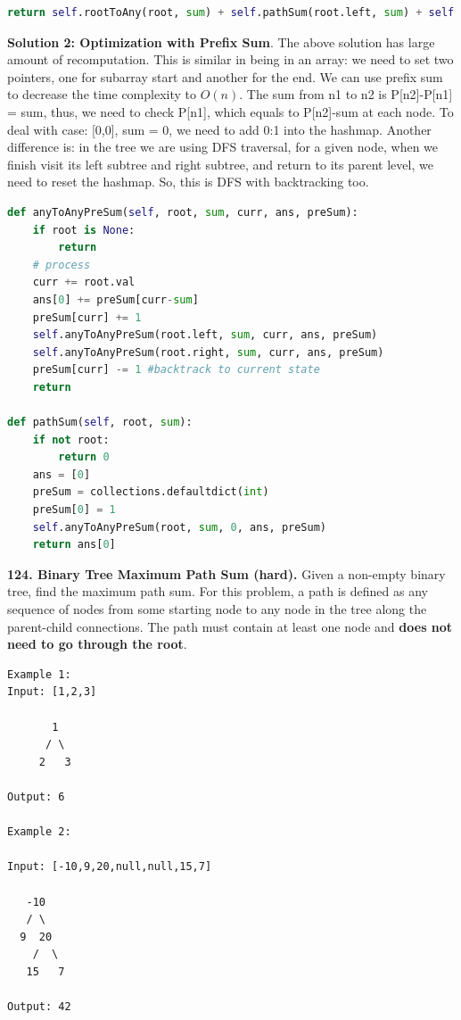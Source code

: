 \documentclass[../main.tex]{subfiles}
\begin{document}
\begin{examples}[resume]
\begin{lstlisting}[language = Python]
    return self.rootToAny(root, sum) + self.pathSum(root.left, sum) + self.pathSum(root.right, sum)
\end{lstlisting}
\textbf{Solution 2: Optimization with Prefix Sum}. The above solution has large amount of recomputation. This is similar in being in an array: we need to set two pointers, one for subarray start and another for the end. We can use prefix sum to decrease the time complexity to $O(n)$. The sum from n1 to n2 is P[n2]-P[n1] = sum, thus, we need to check P[n1], which equals to P[n2]-sum at each node.  To deal with case: [0,0], sum = 0, we need to add 0:1 into the hashmap. Another difference is: in the tree we are using DFS traversal, for a given node, when we finish visit its left subtree and right subtree, and return to its parent level, we need to reset the hashmap. So, this is DFS with backtracking too.
\begin{lstlisting}[language=Python]
def anyToAnyPreSum(self, root, sum, curr, ans, preSum):
    if root is None: 
        return 
    # process
    curr += root.val
    ans[0] += preSum[curr-sum]
    preSum[curr] += 1
    self.anyToAnyPreSum(root.left, sum, curr, ans, preSum)
    self.anyToAnyPreSum(root.right, sum, curr, ans, preSum)
    preSum[curr] -= 1 #backtrack to current state
    return

def pathSum(self, root, sum):
    if not root:
        return 0
    ans = [0]
    preSum = collections.defaultdict(int)
    preSum[0] = 1
    self.anyToAnyPreSum(root, sum, 0, ans, preSum)
    return ans[0]
\end{lstlisting}
\item \textbf{124. Binary Tree Maximum Path Sum (hard).} Given a non-empty binary tree, find the maximum path sum. For this problem, a path is defined as any sequence of nodes from some starting node to any node in the tree along the parent-child connections. The path must contain at least one node and \textbf{does not need to go through the root}.
\begin{lstlisting}[numbers=none]
Example 1:
Input: [1,2,3]

       1
      / \
     2   3

Output: 6

Example 2:

Input: [-10,9,20,null,null,15,7]

   -10
   / \
  9  20
    /  \
   15   7

Output: 42
\end{lstlisting} 


\end{examples}
\end{document}
